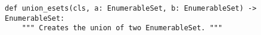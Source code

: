 \begin{verbatim}
def union_esets(cls, a: EnumerableSet, b: EnumerableSet) -> EnumerableSet:
    """ Creates the union of two EnumerableSet. """
\end{verbatim}